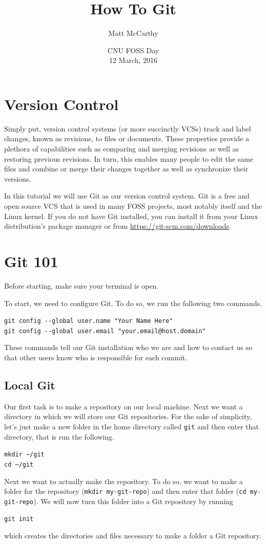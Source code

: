 \documentclass[notitlepage]{simple}
\author{Matt McCarthy}
\title{How To Git}
\date{CNU FOSS Day\\ 12 March, 2016}
\begin{document}
\maketitle

\section{Version Control}

Simply put, version control systems (or more succinctly VCSs) track and label changes, known as revisions, to files or documents.
These properties provide a plethora of capabilities such as comparing and merging revisions as well as restoring previous revisions.
In turn, this enables many people to edit the same files and combine or merge their changes together as well as synchronize their versions.

In this tutorial we will use Git as our version control system.
Git is a free and open source VCS that is used in many FOSS projects, most notably itself and the Linux kernel.
If you do not have Git installed, you can install it from your Linux distribution's package manager or from \url{https://git-scm.com/downloads}.

\section{Git 101}

Before starting, make sure your terminal is open.

To start, we need to configure Git.
To do so, we run the following two commands.
\begin{terminal}
	\verb|git config --global user.name "Your Name Here"|\\
	\verb|git config --global user.email "your.email@host.domain"|
\end{terminal}
These commands tell our Git installation who we are and how to contact us so that other users know who is responsible for each commit.

\subsection{Local Git}

Our first task is to make a repository on our local machine.
Next we want a directory in which we will store our Git repositories.
For the sake of simplicity, let's just make a new folder in the home directory called \verb|git| and then enter that directory, that is run the following.
\begin{terminal}
	\verb|mkdir ~/git|\\
	\verb|cd ~/git|
\end{terminal}
Next we want to actually make the repository.
To do so, we want to make a folder for the repository (\verb|mkdir my-git-repo|) and then enter that folder (\verb|cd my-git-repo|).
We will now turn this folder into a Git repository by running
\begin{terminal}
	\verb|git init|
\end{terminal}
which creates the directories and files necessary to make a folder a Git repository.
\end{document}
